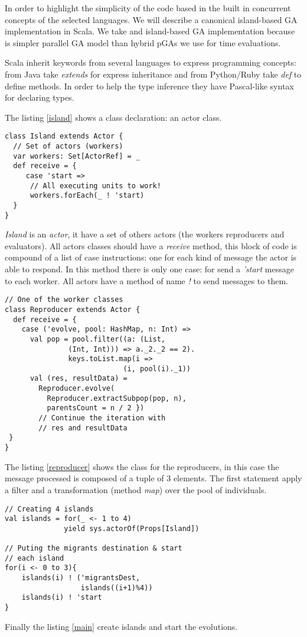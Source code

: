 In order to highlight the simplicity of the code based in the built in concurrent concepts of the selected languages. We will describe a canonical island-based GA implementation in Scala. We take and island-based GA implementation because is simpler parallel GA model than  hybrid pGAs we use for time evaluations.

Scala inherit keywords from several languages to express programming concepts: from Java take {\em extends} for express inheritance and from Python/Ruby take {\em def} to define methods. In order to help the type inference they have Pascal-like syntax for declaring types.

The listing \ref{island} shows a class declaration: an actor class.

\begin{lstlisting}[frame=none]
class Island extends Actor {
  // Set of actors (workers)
  var workers: Set[ActorRef] = _
  def receive = {
     case 'start =>
      // All executing units to work!
      workers.forEach(_ ! 'start)
  }
}
\end{lstlisting}

{\em Island} is an {\em actor}, it have a set of others actors (the workers reproducers and evaluators). All actors classes should have a {\em receive} method, this block of code is compound of a list of case instructions: one for each kind of message the actor is able to respond. In this method there is only one case: for send a {\em 'start} message to each worker. All actors have a method of name {\em !} to send messages to them.

\begin{lstlisting}[frame=none]
// One of the worker classes
class Reproducer extends Actor {
  def receive = {
    case ('evolve, pool: HashMap, n: Int) =>
      val pop = pool.filter((a: (List,
               (Int, Int))) => a._2._2 == 2).
               keys.toList.map(i =>
                            (i, pool(i)._1))
      val (res, resultData) =
        Reproducer.evolve(
          Reproducer.extractSubpop(pop, n),
          parentsCount = n / 2 })
        // Continue the iteration with
        // res and resultData
 }
}
\end{lstlisting}

The listing \ref{reproducer} shows the class for the reproducers, in this case the message processed is composed of a tuple of 3 elements. The first statement apply a filter and a transformation (method {\em map}) over the pool of individuals.

\begin{lstlisting}[frame=none]
// Creating 4 islands
val islands = for(_ <- 1 to 4)
              yield sys.actorOf(Props[Island])
		
// Puting the migrants destination & start
// each island
for(i <- 0 to 3){
	islands(i) ! ('migrantsDest,
	              islands((i+1)%4))
	islands(i) ! 'start
}
\end{lstlisting}

Finally the listing \ref{main} create islands and start the evolutions.  
